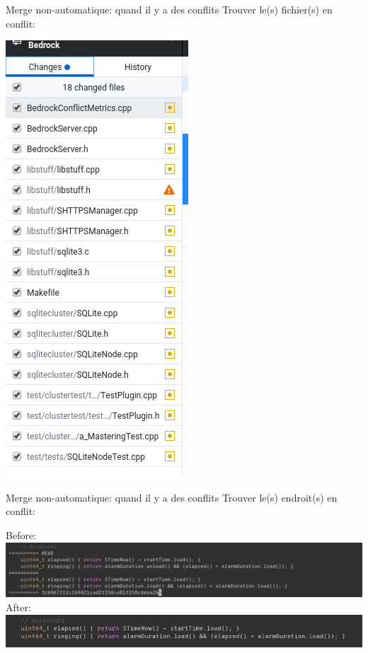 \documentclass{beamer}
\begin{document}
\begin{frame}{Merge non-automatique: quand il y a des conflits}
    Trouver le(s) fichier(s) en conflit:\\
    \begin{center}
	 	   \includegraphics[scale=0.4]{img/github_desktop/conflit_2.png}
    \end{center}
\end{frame}

\begin{frame}{Merge non-automatique: quand il y a des conflits}
    Trouver le(s) endroit(s) en conflit:\\
    \begin{center}
    Before:\\
	 	   \includegraphics[scale=0.30]{img/github_desktop/merge_before.png}\\
	After:\\
	 	   \includegraphics[scale=0.35]{img/github_desktop/merge_after.png}
    \end{center}
\end{frame}
\end{document}
